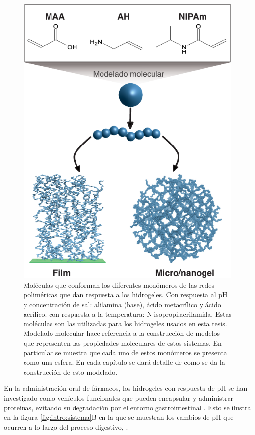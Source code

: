\begin{figure}[!tb]
	\centering
	\includegraphics[width=0.8\linewidth]{Figures/modelos/hidrogeles.pdf}
	\caption{Mol\'eculas  que conforman los diferentes mon\'omeros de las redes polim\'ericas que dan respuesta a los hidrogeles. Con respuesta al pH y concentraci\'on de sal: alilamina (base),  \'acido metacr\'ilico y \'acido acr\'ilico. con respuesta a la temperatura: N-isopropilacrilamida.
		Estas mol\'eculas son las utilizadas para los hidrogeles usados en esta tesis. Modelado molecular hace referencia a la construcci\'on  de modelos que representen las propiedades moleculares de estos sistemas. En particular se muestra que cada uno de estos mon\'omeros se presenta como una esfera. En cada cap\'itulo se dar\'a detalle de como se da la construcci\'on de esto modelado. }
	\label{fig:intro:acidos-aa-maa}
\end{figure}


En la administraci\'on oral de f\'armacos, los hidrogeles con respuesta de pH se han investigado como veh\'iculos funcionales que pueden encapsular y administrar prote\'inas, evitando su degradaci\'on por el entorno gastrointestinal \cite{malmsten2010biomacromolecules,renukuntla2013approaches,koetting2014ph}. Esto se ilustra en la figura \ref{fig:intro:sistema}B en la que se muestran los cambios de pH que ocurren a lo largo del proceso digestivo, .


